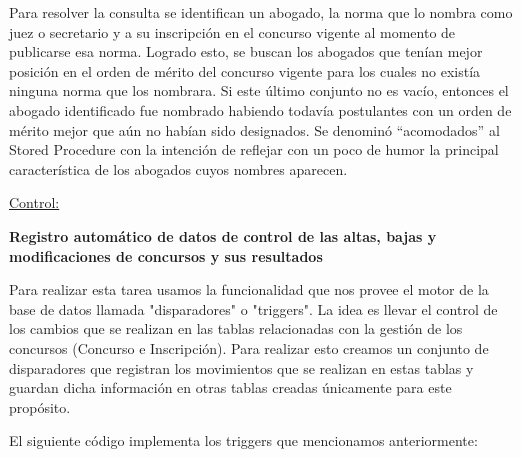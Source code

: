 Para resolver la consulta se identifican un abogado, la norma que lo nombra como juez o secretario y a su inscripción en el concurso vigente al momento de publicarse esa norma. Logrado esto, se buscan los abogados que tenían mejor posición en el orden de mérito del concurso vigente para los cuales no existía ninguna norma que los nombrara. Si este último conjunto no es vacío, entonces el abogado identificado fue nombrado habiendo todavía postulantes con un orden de mérito mejor que aún no habían sido designados.
Se denominó ``acomodados'' al Stored Procedure con la intención de reflejar con un poco de humor la principal característica de los abogados cuyos nombres aparecen.


\underline{Control:}

\textbf{Registro automático de datos de control de las altas, bajas y modificaciones de concursos y sus resultados}

Para realizar esta tarea usamos la funcionalidad que nos provee el motor de la base de datos llamada "disparadores" o "triggers". La idea es llevar el control de los cambios que se realizan en las tablas relacionadas con la gestión de los concursos (Concurso e Inscripción). Para realizar esto creamos un conjunto de disparadores que registran los movimientos que se realizan en estas tablas y guardan dicha información en otras tablas creadas únicamente para este propósito.

El siguiente código implementa los triggers que mencionamos anteriormente:

